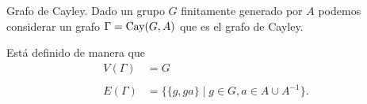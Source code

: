 \documentclass[aspectratio=169, 10pt]{beamer}
\begin{document}
\begin{frame}[fragile]{Grafo de Cayley.}
	Dado un grupo $G$ finitamente generado por $A$ podemos considerar un grafo $\Gamma =\text{Cay}(G, A)$ que es el grafo de Cayley.

	Está definido de manera que 
	\begin{align*}
		V(\Gamma) &= G   \\ 
		& \\
		E(\Gamma) &= \{ \{ g,ga \}  \mid g \in G, a \in A \cup A^{-1}  \}. 
	\end{align*}

				
\end{frame}
\end{document}
